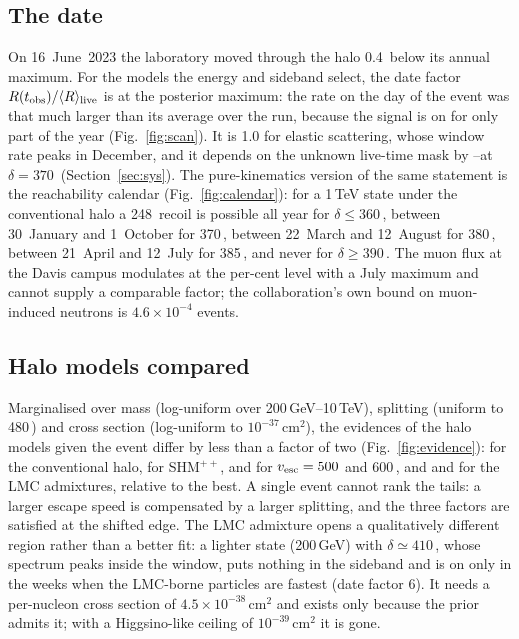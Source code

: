 \documentclass[11pt]{article}
\newcommand{\vesc}{v_{\rm esc}\xspace}
\newcommand{\keV}{\,\mathrm{keV}\xspace}
\newcommand{\kms}{\,\mathrm{km\,s^{-1}}\xspace}
\begin{document}
\subsection{The date}
On 16~June~2023 the laboratory moved through the halo 0.4\kms below its annual
maximum.  For the models the energy and sideband select, the date factor
$R(t_{\rm obs})/\langle R\rangle_{\rm live}$ is \TimingBFbest at the posterior maximum:
the rate on the day of the event was that much larger than its average over the
run, because the signal is on for only part of the year (Fig.~\ref{fig:scan}).  It is
1.0 for elastic scattering, whose window rate peaks in December, and it depends on
the unknown live-time mask by \TimingMaskMin--\TimingMaskMax at $\delta=370$\keV
(Section~\ref{sec:sys}).  The pure-kinematics version of the same statement is the
reachability calendar (Fig.~\ref{fig:calendar}): for a 1\,TeV state under the
conventional halo a 248\keV recoil is possible all year for $\delta\le360$\keV,
between 30~January and 1~October for 370\keV, between 22~March and 12~August for
380\keV, between 21~April and 12~July for 385\keV, and never for $\delta\ge390$\keV.
The muon flux at the Davis campus modulates at the per-cent level with a July maximum
and cannot supply a comparable factor; the collaboration's own bound on muon-induced
neutrons is $4.6\times10^{-4}$ events.

\subsection{Halo models compared}
Marginalised over mass (log-uniform over 200\,GeV--10\,TeV), splitting (uniform to
480\keV) and cross section (log-uniform to $10^{-37}$\,cm$^2$), the evidences of the
halo models given the event differ by less than a factor of two
(Fig.~\ref{fig:evidence}): \EvidShmLz for the conventional halo, \EvidShmPp for
SHM$^{++}$, \EvidShmVescLow and \EvidShmVescHigh for $\vesc=500$ and 600\kms, and
\EvidShmLmcLow and \EvidShmLmcHigh for the LMC admixtures, relative to the best.
A single event cannot rank the tails: a larger escape speed is compensated by a
larger splitting, and the three factors are satisfied at the shifted edge.  The
LMC admixture opens a qualitatively different region rather than a better fit: a
lighter state (200\,GeV) with $\delta\simeq410$\keV, whose spectrum peaks inside the
window, puts nothing in the sideband and is on only in the weeks when the
LMC-borne particles are fastest (date factor 6).  It needs a per-nucleon cross
section of $4.5\times10^{-38}$\,cm$^2$ and exists only because the prior admits it;
with a Higgsino-like ceiling of $10^{-39}$\,cm$^2$ it is gone.
\end{document}
